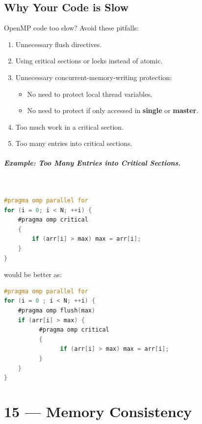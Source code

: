 \documentclass[a4paper]{report}
\begin{document}
\section*{Why Your Code is Slow}
OpenMP code too slow? Avoid these pitfalls:
  \begin{enumerate}
    \item Unnecessary flush directives.
    \item Using critical sections or locks instead of atomic.
    \item Unnecessary concurrent-memory-writing protection:
      \begin{itemize}
        \item No need to protect local thread variables.
        \item No need to protect if only accessed in {\bf single} or
          {\bf master}.
      \end{itemize}
    \item Too much work in a critical section.
    \item Too many entries into critical sections.
  \end{enumerate}

\paragraph{Example: Too Many Entries into Critical Sections.}~

  \begin{lstlisting}[language=C]
#pragma omp parallel for
for (i = 0; i < N; ++i) { 
    #pragma omp critical
    {
        if (arr[i] > max) max = arr[i];
    } 
}
  \end{lstlisting}

would be better as:

  \begin{lstlisting}[language=C]
#pragma omp parallel for
for (i = 0 ; i < N; ++i) { 
    #pragma omp flush(max)
    if (arr[i] > max) {
          #pragma omp critical
          {
                if (arr[i] > max) max = arr[i];
          }
    }
}
\end{lstlisting}










\chapter*{15 --- Memory Consistency}
\end{document}
